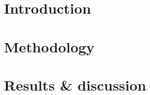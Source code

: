 \documentclass[10pt,a4paper,twoside,openright,titlepage,fleqn,%
               headinclude,,footinclude,BCOR5mm,%
               numbers=noenddot,cleardoublepage=empty,%
               tablecaptionabove]{scrbook}
\begin{document}

\pagestyle{plain}
\dominitoc

\frontmatter


\clearpage

\pagestyle{scrheadings}
\onehalfspacing



\clearpage

\incrementmtc
\incrementmtc
\cleardoublepage

\mainmatter
{}

\part{Introduction}
\label{part:introduction}




\part{Methodology}
\label{part:methodology}



\part{Results \& discussion}
\label{part:results}


% 


\backmatter
\clearpage

\clearpage

\end{document}
